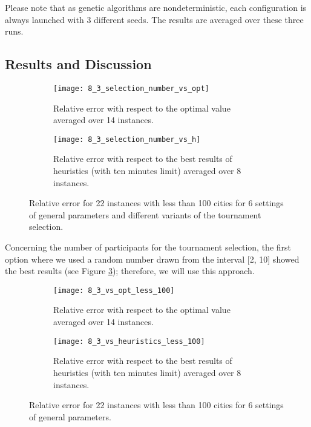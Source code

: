  Please note that as genetic algorithms are nondeterministic, each configuration is always launched with 3 different seeds. The results are averaged over these three runs.\par 


\subsection{Results and Discussion}
\label{subsec:parameters_results}

 \begin{figure}[htp] \centering
	\begin{subfigure}[t]{0.45\textwidth}
		\texttt{[image: 8\_3\_selection\_number\_vs\_opt]}
		\caption{Relative error with respect to the optimal value averaged over 14 instances.}
		\label{fig:8_3_selection_number_vs_opt}
	\end{subfigure}
	\hfill
	\begin{subfigure}[t]{0.45\textwidth}
		\centering
		\texttt{[image: 8\_3\_selection\_number\_vs\_h]}
		\caption{Relative error with respect to the best results of heuristics (with ten minutes limit) averaged over 8 instances.}
		\label{fig:8_3_selection_number_vs_h}
	\end{subfigure}	
	\caption{Relative error for 22 instances with less than 100 cities for 6 settings of general parameters and different variants of the tournament selection.}
	\label{fig:8_3_selection_number}
\end{figure}
	
Concerning the number of participants for the tournament selection, the first option where we used a random number drawn from the interval [2, 10] showed the best results (see Figure \ref{fig:8_3_selection_number}); therefore, we will use this approach.\par

\begin{figure}[htp] \centering
	\begin{subfigure}[t]{0.45\textwidth}
		\texttt{[image: 8\_3\_vs\_opt\_less\_100]}
		\caption{Relative error with respect to the optimal value averaged over 14 instances.}
		\label{fig:8_3_less_100:vs_opt}
	\end{subfigure}
	\hfill
	\begin{subfigure}[t]{0.45\textwidth}
		\centering
		\texttt{[image: 8\_3\_vs\_heuristics\_less\_100]}
		\caption{Relative error with respect to the best results of heuristics (with ten minutes limit) averaged over 8 instances.}
		\label{fig:8_3_less_100:vs_heuristics}
	\end{subfigure}	
	\caption{Relative error for 22 instances with less than 100 cities for 6 settings of general parameters.}
	\label{fig:8_3_less_100}
\end{figure}

